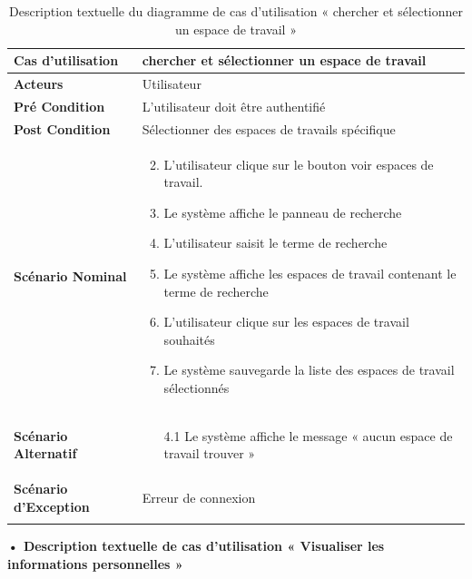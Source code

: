\begin{longtable}{|p{5cm}|p{10cm}|}
\hline
\textbf{Cas d'utilisation}&chercher et sélectionner un espace de travail   \\
\hline
\textbf{Acteurs}&Utilisateur\\
\hline
\textbf{Pré Condition}&L'utilisateur doit être authentifié\\
\hline
\textbf{Post Condition}&Sélectionner des espaces de travails spécifique \\
\hline
\textbf{Scénario Nominal}&
\vspace{-\baselineskip}
\begin{enumerate}
  \setcounter{enumi}{1}
  \item L'utilisateur clique sur le bouton voir espaces de travail.
  \item Le système affiche le panneau de recherche
  \item L'utilisateur saisit le terme de recherche
  \item Le système affiche les espaces de travail contenant le terme de recherche
  \item L'utilisateur clique sur les espaces de travail souhaités
  \item Le système sauvegarde la liste des espaces de travail sélectionnés 
  
\end{enumerate}\\
\hline
\textbf{Scénario Alternatif}&
\vspace{-\baselineskip}
\begin{enumerate}
 \item [4.1] Le système affiche le message « aucun espace de travail trouver » 
\end{enumerate}\\
\hline
\textbf{Scénario d'Exception}&
Erreur de connexion\\
\hline
\caption{Description textuelle du diagramme de cas d'utilisation « chercher et sélectionner un espace de travail   »}
\label{tab:use_case_search_select_workspace}
\end{longtable}


\textbf{•	Description textuelle de cas d'utilisation « Visualiser les informations personnelles  »}

